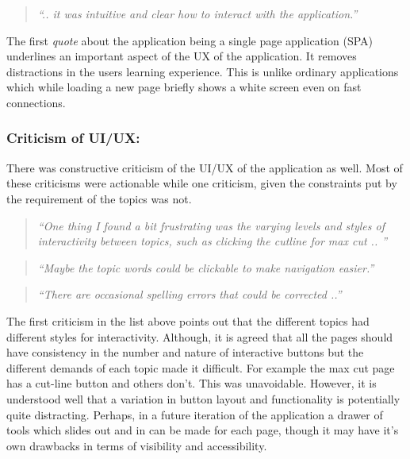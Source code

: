 \vspace{0.06 in}
\begin{quote}
\emph{``.. it was intuitive and clear how to
interact with the application.''}
\end{quote}


The first \emph{quote} about the application being a single page application
(SPA) underlines an important aspect of the UX of the application.  It removes
distractions in the users learning experience. This is unlike ordinary
applications which while loading a new page briefly shows a white screen even
on fast connections.


\subsubsection{Criticism of UI/UX:}
There was constructive criticism of the UI/UX of the application as well.
Most of these criticisms were actionable while one criticism, given the
constraints put by the requirement of the topics was not.

\begin{quote}
\emph{``One thing I found a bit frustrating was the varying levels and styles of
interactivity between topics, such as clicking the cutline for max cut .. ''}
\end{quote}

\vspace{0.06 in}

\begin{quote}
\emph{``Maybe the topic words could be clickable to make navigation easier.''}
\end{quote}

\vspace{0.06 in}
\begin{quote}
\emph{``There are occasional spelling errors that
   could be corrected ..'' }
\end{quote}

The first criticism in the list above points out that the different topics had
different styles for interactivity.  Although, it is agreed that all the pages
should have consistency in the number and nature of interactive buttons
but the different demands of each topic made it difficult. For example the max
cut page has a cut-line button and others don't. This was unavoidable.
However, it is understood well that a variation in button layout and
functionality is potentially quite distracting. Perhaps, in a future iteration
of the application a drawer of tools which slides out and in can be made for
each page, though it may have it's own drawbacks in terms of visibility and
accessibility.


